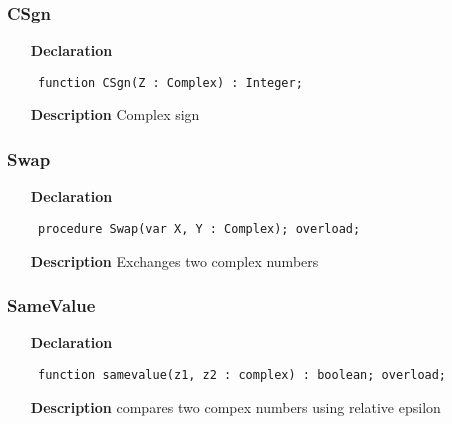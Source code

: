 \documentclass[12pt,a4paper,oneside]{report}
\newcommand{\declarationitem}[1]{\textbf{#1}}
\newcommand{\descriptiontitle}[1]{\textbf{#1}}
\newcommand{\code}[1]{\texttt{#1}}
\begin{document}
\subsubsection{CSgn}
\label{ucomplex-CSgn}
\begin{itemize}\item[\declarationitem{Declaration}\hfill]
\begin{flushleft}
\code{
function CSgn(Z : Complex) : Integer;}

\end{flushleft}

\par
\item[\descriptiontitle{Description}]
Complex sign

\end{itemize}
\subsubsection{Swap}
\label{ucomplex-Swap}
\begin{itemize}\item[\declarationitem{Declaration}\hfill]
\begin{flushleft}
\code{
procedure Swap(var X, Y : Complex); overload;}

\end{flushleft}

\par
\item[\descriptiontitle{Description}]
Exchanges two complex numbers

\end{itemize}
\subsubsection{SameValue}
\label{ucomplex-samevalue}
\begin{itemize}\item[\declarationitem{Declaration}\hfill]
\begin{flushleft}
\code{
function samevalue(z1, z2 : complex) : boolean; overload;}

\end{flushleft}

\par
\item[\descriptiontitle{Description}]
compares two compex numbers using relative epsilon

\end{itemize}
\end{document}
